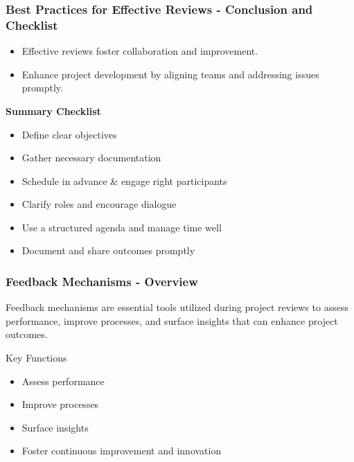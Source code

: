 \documentclass[aspectratio=169]{beamer}
\begin{document}
\begin{frame}[fragile]
    \frametitle{Best Practices for Effective Reviews - Conclusion and Checklist}
    \begin{itemize}
        \item Effective reviews foster collaboration and improvement.
        \item Enhance project development by aligning teams and addressing issues promptly.
    \end{itemize}
    
    \textbf{Summary Checklist}
    \begin{itemize}
        \item Define clear objectives
        \item Gather necessary documentation
        \item Schedule in advance & engage right participants
        \item Clarify roles and encourage dialogue
        \item Use a structured agenda and manage time well
        \item Document and share outcomes promptly
    \end{itemize}
\end{frame}

\begin{frame}[fragile]
    \frametitle{Feedback Mechanisms - Overview}
    Feedback mechanisms are essential tools utilized during project reviews to assess performance, improve processes, and surface insights that can enhance project outcomes. 
    \begin{block}{Key Functions}
        \begin{itemize}
            \item Assess performance
            \item Improve processes 
            \item Surface insights
            \item Foster continuous improvement and innovation
        \end{itemize}
    \end{block}
\end{frame}
\end{document}

